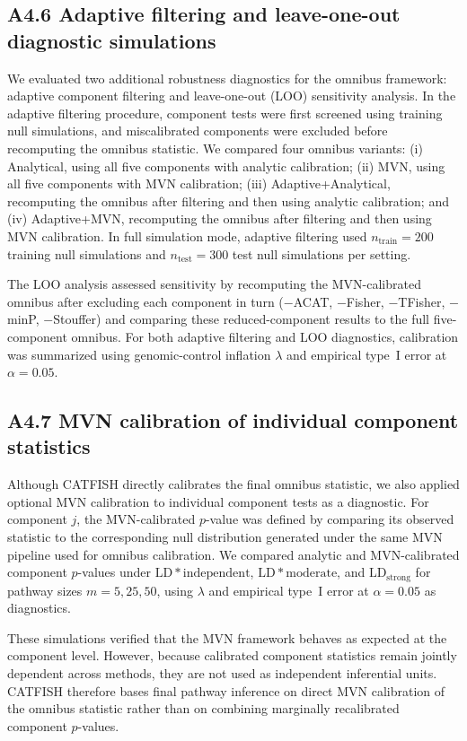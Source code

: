 \documentclass[unnumsec,webpdf,contemporary,large]{oup-authoring-template}%
\theoremstyle{thmstyleone}%
\theoremstyle{thmstyletwo}%
\theoremstyle{thmstylethree}%
\begin{document}
\begin{appendices}
\subsection{A4.6 Adaptive filtering and leave-one-out diagnostic simulations}

We evaluated two additional robustness diagnostics for the omnibus framework: adaptive component filtering and leave-one-out (LOO) sensitivity analysis. In the adaptive filtering procedure, component tests were first screened using training null simulations, and miscalibrated components were excluded before recomputing the omnibus statistic. We compared four omnibus variants: (i) Analytical, using all five components with analytic calibration; (ii) MVN, using all five components with MVN calibration; (iii) Adaptive+Analytical, recomputing the omnibus after filtering and then using analytic calibration; and (iv) Adaptive+MVN, recomputing the omnibus after filtering and then using MVN calibration. In full simulation mode, adaptive filtering used $n_{\mathrm{train}}=200$ training null simulations and $n_{\mathrm{test}}=300$ test null simulations per setting.

The LOO analysis assessed sensitivity by recomputing the MVN-calibrated omnibus after excluding each component in turn ($-$ACAT, $-$Fisher, $-$TFisher, $-$minP, $-$Stouffer) and comparing these reduced-component results to the full five-component omnibus. For both adaptive filtering and LOO diagnostics, calibration was summarized using genomic-control inflation $\lambda$ and empirical type~I error at $\alpha=0.05$.

\subsection{A4.7 MVN calibration of individual component statistics}

Although CATFISH directly calibrates the final omnibus statistic, we also applied optional MVN calibration to individual component tests as a diagnostic. For component $j$, the MVN-calibrated $p$-value was defined by comparing its observed statistic to the corresponding null distribution generated under the same MVN pipeline used for omnibus calibration. We compared analytic and MVN-calibrated component $p$-values under $\mathrm{LD}*{\mathrm{independent}}$, $\mathrm{LD}*{\mathrm{moderate}}$, and $\mathrm{LD}_{\mathrm{strong}}$ for pathway sizes $m=5,25,50$, using $\lambda$ and empirical type~I error at $\alpha=0.05$ as diagnostics.

These simulations verified that the MVN framework behaves as expected at the component level. However, because calibrated component statistics remain jointly dependent across methods, they are not used as independent inferential units. CATFISH therefore bases final pathway inference on direct MVN calibration of the omnibus statistic rather than on combining marginally recalibrated component $p$-values.


\end{appendices}
\end{document}
